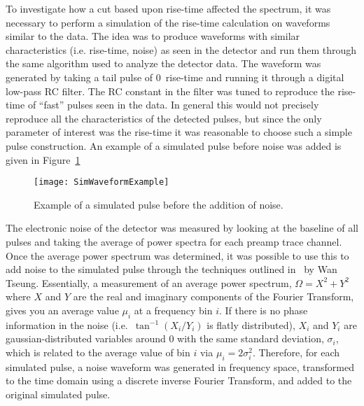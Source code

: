 	To investigate how a cut based upon rise-time affected the spectrum, it was necessary to perform a simulation of the rise-time calculation on waveforms similar to the data.  The idea was to produce waveforms with similar characteristics (i.e. rise-time, noise) as seen in the detector and run them through the same algorithm used to analyze the detector data.  The waveform was generated by taking a tail pulse of 0~rise-time and running it through a digital low-pass RC filter.  The RC constant in the filter was tuned to reproduce the rise-time of ``fast'' pulses seen in the data.  In general this would not precisely reproduce all the characteristics of the detected pulses, but since the only parameter of interest was the rise-time it was reasonable to choose such a simple pulse construction.  An example of a simulated pulse before noise was added is given in Figure~\ref{fig:SimWaveformExample}
				\begin{figure}
					\centering
					\texttt{[image: SimWaveformExample]}
					\caption[Example of a simulated pulse before the addition of noise.]
					{Example of a simulated pulse before the addition of noise.}
					\label{fig:SimWaveformExample}
				\end{figure}
	
	The electronic noise of the detector was measured by looking at the baseline of all pulses and taking the average of power spectra for each preamp trace channel.  Once the average power spectrum was determined, it was possible to use this to add noise to the simulated pulse through the techniques outlined in~\cite{WanThesis08} by Wan Tseung.  Essentially, a measurement of an average power spectrum, $\Omega = X^{2} + Y^{2}$ where $X$ and $Y$ are the real and imaginary components of the Fourier Transform, gives you an average value $\mu_{i}$ at a frequency bin $i$.  If there is no phase information in the noise (i.e.~$\tan^{-1} (X_{i}/Y_{i})$ is flatly distributed), $X_{i}$ and $Y_{i}$ are gaussian-distributed variables around 0 with the same standard deviation, $\sigma_{i}$, which is related to the average value of bin $i$ via  $\mu_{i} = 2 \sigma_{i}^{2}$.  Therefore, for each simulated pulse, a noise waveform was generated in frequency space, transformed to the time domain using a discrete inverse Fourier Transform, and added to the original simulated pulse.  
	
